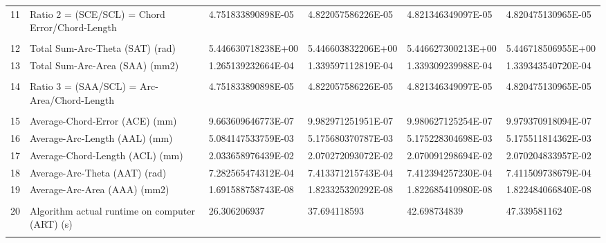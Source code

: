 \begin{landscape}
\begin{table}[ht]
{\begin{tabular}{ p{0.2cm} p{8.80cm} p{4.00cm} p{4.0cm} p{4.00cm} p{4.0cm}}
	11	&	Ratio 2 = (SCE/SCL) = Chord Error/Chord-Length	&	4.751833890898E-05	&	4.822057586226E-05	&	4.821346349097E-05	&	4.820475130965E-05	\\
	&		&		&		&		&		\\
	12	&	Total Sum-Arc-Theta (SAT) (rad)	&	5.446630718238E+00	&	5.446603832206E+00	&	5.446627300213E+00	&	5.446718506955E+00	\\
	13	&	Total Sum-Arc-Area (SAA) (mm2)	&	1.265139232664E-04	&	1.339597112819E-04	&	1.339309239988E-04	&	1.339343540720E-04	\\
	&		&		&		&		&		\\
	14	&	Ratio 3 = (SAA/SCL) = Arc-Area/Chord-Length	&	4.751833890898E-05	&	4.822057586226E-05	&	4.821346349097E-05	&	4.820475130965E-05	\\
	&		&		&		&		&		\\
	15	&	Average-Chord-Error (ACE) (mm)	&	9.663609646773E-07	&	9.982971251951E-07	&	9.980627125254E-07	&	9.979370918094E-07	\\
	16	&	Average-Arc-Length (AAL) (mm)	&	5.084147533759E-03	&	5.175680370787E-03	&	5.175228304698E-03	&	5.175511814362E-03	\\
	17	&	Average-Chord-Length (ACL) (mm)	&	2.033658976439E-02	&	2.070272093072E-02	&	2.070091298694E-02	&	2.070204833957E-02	\\
	18	&	Average-Arc-Theta (AAT) (rad)	&	7.282565474312E-04	&	7.413371215743E-04	&	7.412394257230E-04	&	7.411509738679E-04	\\
	19	&	Average-Arc-Area (AAA) (mm2)	&	1.691588758743E-08	&	1.823325320292E-08	&	1.822685410980E-08	&	1.822484066840E-08	\\
	&		&		&		&		&		\\
	20	&	Algorithm actual runtime on computer (ART) (s) 	&	26.306206937	&	37.694118593	&	42.698734839	&	47.339581162	\\
	&		&		&		&		&		\\
\hline	
\end{tabular}

}   %
		
\end{table}
\end{landscape}

\clearpage
\pagebreak
